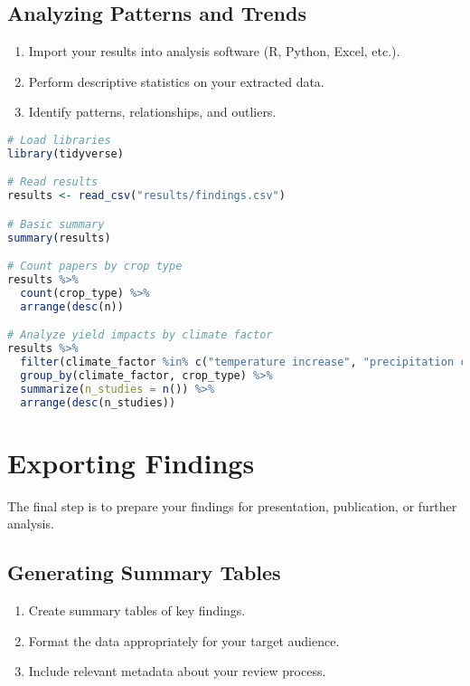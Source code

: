 \subsection{Analyzing Patterns and Trends}

\begin{enumerate}
    \item Import your results into analysis software (R, Python, Excel, etc.).
    \item Perform descriptive statistics on your extracted data.
    \item Identify patterns, relationships, and outliers.
\end{enumerate}

\begin{commandbox}
\begin{lstlisting}[language=R]
# Load libraries
library(tidyverse)

# Read results
results <- read_csv("results/findings.csv")

# Basic summary
summary(results)

# Count papers by crop type
results %>%
  count(crop_type) %>%
  arrange(desc(n))

# Analyze yield impacts by climate factor
results %>%
  filter(climate_factor %in% c("temperature increase", "precipitation change")) %>%
  group_by(climate_factor, crop_type) %>%
  summarize(n_studies = n()) %>%
  arrange(desc(n_studies))
\end{lstlisting}
\end{commandbox}


\section{Exporting Findings}

The final step is to prepare your findings for presentation, publication, or further analysis.

\subsection{Generating Summary Tables}

\begin{enumerate}
    \item Create summary tables of key findings.
    \item Format the data appropriately for your target audience.
    \item Include relevant metadata about your review process.
\end{enumerate}

